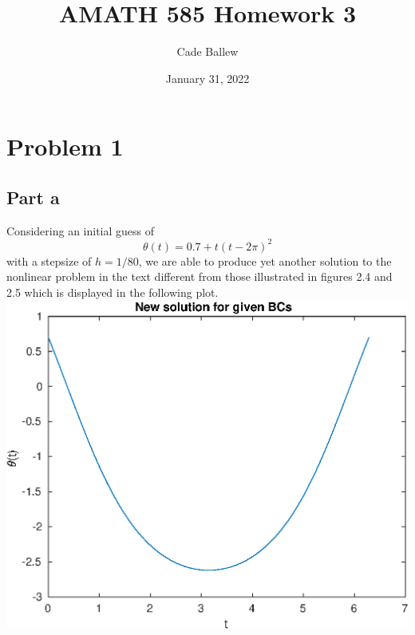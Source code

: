 \documentclass{article}
\title{AMATH 585 Homework 3}
\author{Cade Ballew}
\date{January 31, 2022}
\begin{document}
	
	\maketitle
	
	\section{Problem 1}
	\subsection{Part a}
Considering an initial guess of
\[
\theta(t)=0.7+t(t-2\pi)^2
\]
with a stepsize of $h=1/80$, we are able to produce yet another solution to the nonlinear problem in the text different from those illustrated in figures 2.4 and 2.5 which is displayed in the following plot. \\
	\includegraphics[scale=0.8]{hw3p1a.eps}\\
\end{document}
